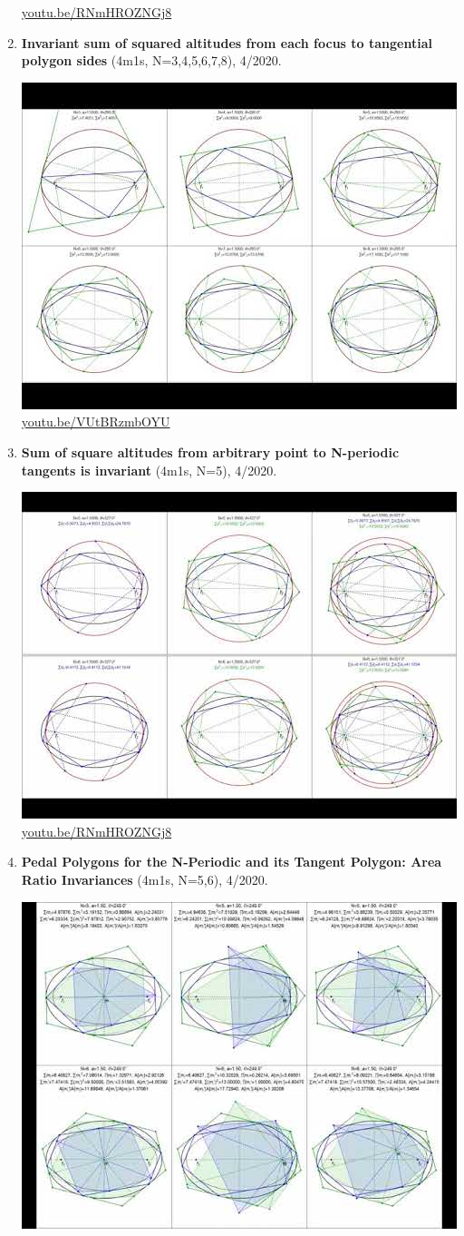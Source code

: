 \documentclass[12pt]{amsart}
\begin{document}
\begin{enumerate}[resume]
\begin{center}
\href{https://youtu.be/RNmHROZNGj8}{\url{youtu.be/RNmHROZNGj8}}\end{center}
% 
\item \textbf{Invariant sum of squared altitudes from each focus to tangential polygon sides} (4m1s, N=3,4,5,6,7,8), 4/2020. 
\begin{center}\includegraphics[width=.5\textwidth]{pics/VUtBRzmbOYU.jpg} \\ 
\href{https://youtu.be/VUtBRzmbOYU}{\url{youtu.be/VUtBRzmbOYU}}\end{center}
% 
\item \textbf{Sum of square altitudes from arbitrary point to N-periodic tangents is invariant} (4m1s, N=5), 4/2020. 
\begin{center}\includegraphics[width=.5\textwidth]{pics/RNmHROZNGj8.jpg} \\ 
\href{https://youtu.be/RNmHROZNGj8}{\url{youtu.be/RNmHROZNGj8}}\end{center}
% 
\item \textbf{Pedal Polygons for the N-Periodic and its Tangent Polygon: Area Ratio Invariances} (4m1s, N=5,6), 4/2020. 
\begin{center}\includegraphics[width=.5\textwidth]{pics/6F7Y3UKJzdk.jpg} \\ 

\end{center}
\end{enumerate}
\end{document}
